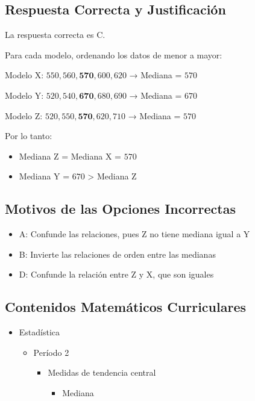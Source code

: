 \documentclass[
]{article}
\providecommand{\tightlist}{%
  \setlength{\itemsep}{0pt}\setlength{\parskip}{0pt}}
\begin{document}
\subsection{Respuesta Correcta y
Justificación}\label{respuesta-correcta-y-justificaciuxf3n}

La respuesta correcta es C.

Para cada modelo, ordenando los datos de menor a mayor:

Modelo X: \(550, 560, \mathbf{570}, 600, 620\) → Mediana = \(570\)

Modelo Y: \(520, 540, \mathbf{670}, 680, 690\) → Mediana = \(670\)

Modelo Z: \(520, 550, \mathbf{570}, 620, 710\) → Mediana = \(570\)

Por lo tanto:

\begin{itemize}
\tightlist
\item
  Mediana Z = Mediana X = \(570\)
\item
  Mediana Y = \(670\) \textgreater{} Mediana Z
\end{itemize}

\subsection{Motivos de las Opciones
Incorrectas}\label{motivos-de-las-opciones-incorrectas}

\begin{itemize}
\tightlist
\item
  A: Confunde las relaciones, pues Z no tiene mediana igual a Y
\item
  B: Invierte las relaciones de orden entre las medianas
\item
  D: Confunde la relación entre Z y X, que son iguales
\end{itemize}

\subsection{Contenidos Matemáticos
Curriculares}\label{contenidos-matemuxe1ticos-curriculares-1}

\begin{itemize}
\tightlist
\item
  Estadística

  \begin{itemize}
  \tightlist
  \item
    Período 2

    \begin{itemize}
    \tightlist
    \item
      Medidas de tendencia central

      \begin{itemize}
      \tightlist
      \item
        Mediana
      \end{itemize}
    \end{itemize}
  \end{itemize}
\end{itemize}
\end{document}
